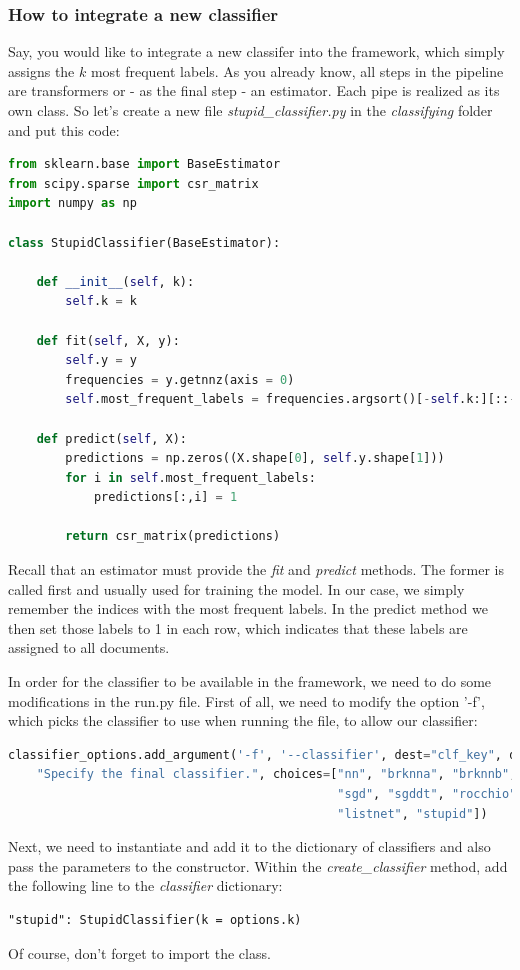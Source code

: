 \documentclass{article}
\begin{document}
\subsubsection{How to integrate a new classifier}
Say, you would like to integrate a new classifer into the framework, which simply assigns the $k$ most frequent labels.
As you already know, all steps in the
pipeline are transformers or - as the final step - an estimator. Each pipe is realized as its own class. So let's
create a new file \emph{stupid\_classifier.py} in the \emph{classifying} folder and put this code:
\begin{lstlisting}[language={Python}]
from sklearn.base import BaseEstimator
from scipy.sparse import csr_matrix
import numpy as np

class StupidClassifier(BaseEstimator):

    def __init__(self, k):
        self.k = k

    def fit(self, X, y):
        self.y = y
        frequencies = y.getnnz(axis = 0)
        self.most_frequent_labels = frequencies.argsort()[-self.k:][::-1]

    def predict(self, X):
        predictions = np.zeros((X.shape[0], self.y.shape[1]))
        for i in self.most_frequent_labels:
            predictions[:,i] = 1

        return csr_matrix(predictions)
\end{lstlisting}
Recall that an estimator must provide the \emph{fit} and \emph{predict} methods. The former is called first and usually
used for training the model. In our case, we simply remember the indices with the most frequent labels. In the predict method
we then set those labels to 1 in each row, which indicates that these labels are assigned to all documents.

In order for the classifier to be available in the framework, we need to do some modifications in the run.py file.
First of all, we need to modify the option '-f', which picks the classifier to use when running the file, to allow our
classifier:
\begin{lstlisting}[language={Python}]
    classifier_options.add_argument('-f', '--classifier', dest="clf_key", default="nn", help=
    "Specify the final classifier.", choices=["nn", "brknna", "brknnb", "bbayes", "mbayes", "lsvc",
                                              "sgd", "sgddt", "rocchio", "rocchiodt", "logregress", "logregressdt",
                                              "listnet", "stupid"])
\end{lstlisting}
Next, we need to instantiate and add it to the dictionary of classifiers and also pass the parameters to the constructor.
Within the \emph{create\_classifier} method, add the following line to the \emph{classifier} dictionary:
\begin{lstlisting}
"stupid": StupidClassifier(k = options.k)
\end{lstlisting}
Of course, don't forget to import the class.
\end{document}
